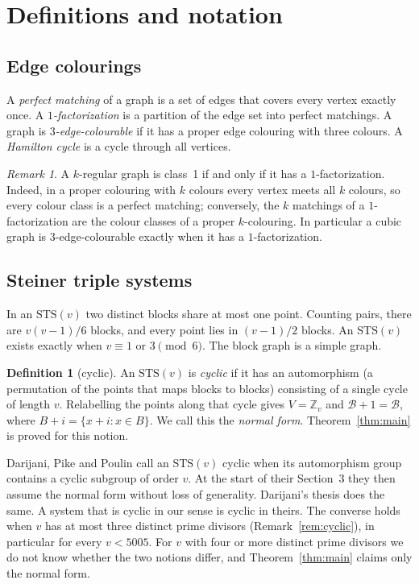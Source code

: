 \documentclass[11pt]{amsart}
\theoremstyle{plain}
\theoremstyle{definition}
\newtheorem*{definition}{Definition}
\theoremstyle{remark}
\newtheorem*{remark*}{Remark}
\numberwithin{equation}{section}
\newcommand{\Z}{\mathbb{Z}}
\newcommand{\cB}{\mathcal{B}}
\newcommand{\STS}{\mathrm{STS}}
\begin{document}
\section{Definitions and notation}\label{sec:defs}

\subsection{Edge colourings}
A \emph{perfect matching} of a graph is a set of edges that covers every vertex exactly once. A \emph{\(1\)-factorization} is a partition of the edge set into perfect matchings. A graph is \emph{\(3\)-edge-colourable} if it has a proper edge colouring with three colours. A \emph{Hamilton cycle} is a cycle through all vertices.

\begin{remark*}
A \(k\)-regular graph is class~1 if and only if it has a \(1\)-factorization. Indeed, in a proper colouring with \(k\) colours every vertex meets all \(k\) colours, so every colour class is a perfect matching; conversely, the \(k\) matchings of a \(1\)-factorization are the colour classes of a proper \(k\)-colouring. In particular a cubic graph is \(3\)-edge-colourable exactly when it has a \(1\)-factorization.
\end{remark*}

\subsection{Steiner triple systems}
In an \(\STS(v)\) two distinct blocks share at most one point. Counting pairs, there are \(v(v-1)/6\) blocks, and every point lies in \((v-1)/2\) blocks. An \(\STS(v)\) exists exactly when \(v\equiv1\) or \(3\pmod 6\). The block graph is a simple graph.

\begin{definition}[cyclic]
An \(\STS(v)\) is \emph{cyclic} if it has an automorphism (a permutation of the points that maps blocks to blocks) consisting of a single cycle of length \(v\). Relabelling the points along that cycle gives \(V=\Z_v\) and \(\cB+1=\cB\), where \(B+i=\{x+i : x\in B\}\). We call this the \emph{normal form}. Theorem~\ref{thm:main} is proved for this notion.
\end{definition}

Darijani, Pike and Poulin \cite[p.~147]{DPP} call an \(\STS(v)\) cyclic when its automorphism group contains a cyclic subgroup of order \(v\). At the start of their Section~3 they then assume the normal form without loss of generality. Darijani's thesis \cite[p.~6 and \S2.2]{Dar} does the same. A system that is cyclic in our sense is cyclic in theirs. The converse holds when \(v\) has at most three distinct prime divisors (Remark~\ref{rem:cyclic}), in particular for every \(v<5005\). For \(v\) with four or more distinct prime divisors we do not know whether the two notions differ, and Theorem~\ref{thm:main} claims only the normal form.
\end{document}
